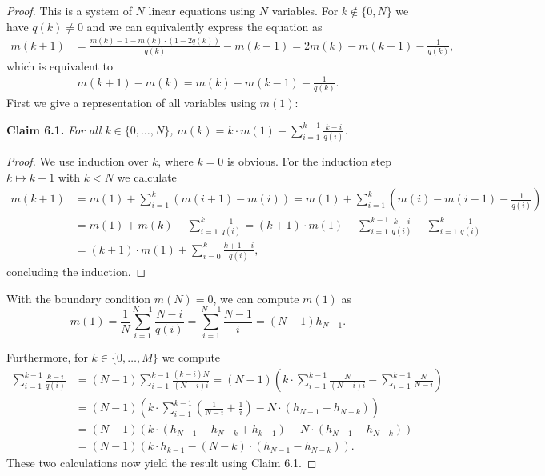 \documentclass[a4paper]{amsart}
\theoremstyle{theorem}
\theoremstyle{definition}
\begin{document}
\begin{enumerate}[label=\alph*)]
\begin{proof}
		This is a system of $N$ linear equations using $N$ variables.
		For $k \notin\{0, N\}$ we have $q(k)\neq 0$ and we can equivalently express the equation as
		\begin{align*}
		m(k+1)
		&= \frac{m(k) - 1 - m(k)\cdot(1-2q(k))}{q(k)} - m(k-1) = 2m(k) - m(k-1) - \frac{1}{q(k)},
		\end{align*}
		which is equivalent to 
		\begin{align*}
			m(k+1) - m(k) = m(k) - m(k-1)-\frac{1}{q(k)}.
		\end{align*}
		First we give a representation of all variables using $m(1)$:
		
		\pagebreak
		
		\vspace{1em}\noindent\textbf{Claim 6.1.}\emph{
			For all $k\in\{0,\dots,N\}$, $m(k) = k\cdot m(1) - \sum_{i=1}^{k-1}\frac{k-i}{q(i)}$.}
		\begin{proof}
			We use induction over $k$, where $k=0$ is obvious.
			For the induction step $k\mapsto k+1$ with $k<N$ we calculate
			\begin{align*}
				m(k+1)
				&= m(1) + \sum_{i=1}^k \left( m(i+1) - m(i) \right)	
				= m(1) + \sum_{i=1}^k \left( m(i) - m(i-1) - \frac{1}{q(i)}  \right)  \\
				&= m(1) + m(k) - \sum_{i=1}^k \frac{1}{q(i)}
				= (k+1) \cdot m(1) - \sum_{i=1}^{k-1} \frac{k-i}{q(i)} - \sum_{i=1}^k  \frac{1}{q(i)}\\
				&= (k+1)\cdot m(1) + \sum_{i=0}^{k} \frac{k+1 - i}{q(i)},
			\end{align*}
			concluding the induction.
		\end{proof}
		
		With the boundary condition $m(N) = 0$, we can compute $m(1)$ as 
		$$m(1)
		= \frac{1}{N}\sum_{i=1}^{N-1} \frac{N-i}{q(i)}
		= \sum_{i=1}^{N-1} \frac{N-1}{i} = (N-1)h_{N-1}.$$
		
		Furthermore, for $k\in\{0,\dots, M\}$ we compute
		\begin{align*}
			\sum_{i=1}^{k-1} \frac{k-i}{q(i)}
			&= (N-1)\sum_{i=1}^{k-1} \frac{(k-i) N}{(N-i) i}
			= (N-1) \left( k\cdot \sum_{i=1}^{k-1}\frac{N}{(N-i) i} - \sum_{i=1}^{k-1} \frac{N}{N-i}       \right) \\
			&= (N-1) \left(  k\cdot \sum_{i=1}^{k-1}\left( \frac{1}{N-i}+\frac{1}{i} \right) - N\cdot \left( h_{N-1} - h_{N-k} \right)   \right)\\
			&= (N-1) \left( k\cdot(h_{N-1}-h_{N-k} + h_{k-1})- N\cdot \left( h_{N-1} - h_{N-k} \right)   \right) \\
			&= (N-1) \left( k\cdot h_{k-1} - (N-k)\cdot(h_{N-1}-h_{N-k})\right).
		\end{align*}
		These two calculations now yield the result using Claim 6.1.
	\end{proof}
	

\end{enumerate}
\end{document}
